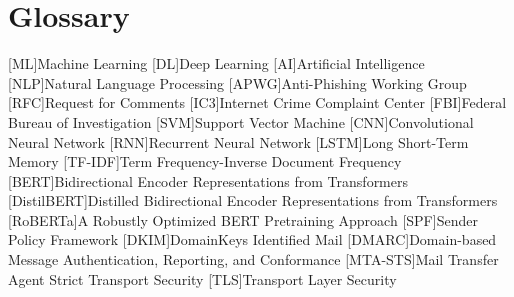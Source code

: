 \chapter{Glossary}

\footnotesize
\SingleSpacing

\begin{multicols}{2}
\begin{acronym}[AAAAAA]

	[ML]{Machine Learning}
	[DL]{Deep Learning}
	[AI]{Artificial Intelligence}
	[NLP]{Natural Language Processing}
	[APWG]{Anti-Phishing Working Group}
	[RFC]{Request for Comments}
	[IC3]{Internet Crime Complaint Center}
	[FBI]{Federal Bureau of Investigation}
	[SVM]{Support Vector Machine}
	[CNN]{Convolutional Neural Network}
	[RNN]{Recurrent Neural Network}
	[LSTM]{Long Short-Term Memory}
	[TF-IDF]{Term Frequency-Inverse Document Frequency}
	[BERT]{Bidirectional Encoder Representations from Transformers}
	[DistilBERT]{Distilled Bidirectional Encoder Representations from Transformers}
	[RoBERTa]{A Robustly Optimized BERT Pretraining Approach}
	[SPF]{Sender Policy Framework}
	[DKIM]{DomainKeys Identified Mail}
	[DMARC]{Domain-based Message Authentication, Reporting, and Conformance}
	[MTA-STS]{Mail Transfer Agent Strict Transport Security}
	[TLS]{Transport Layer Security}

\end{acronym}
\end{multicols}

